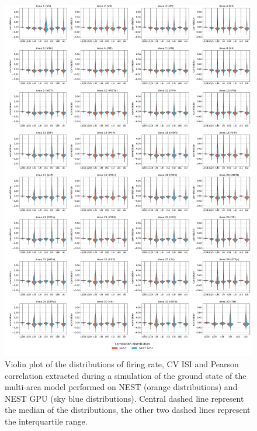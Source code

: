 \documentclass[a4paper, 12pt, twoside, openright]{book}
\begin{document}
\begin{figure}[H]
    \centering
    \includegraphics[width=\columnwidth]{figures/dist_violinplot_vert_gs_correlation.pdf}
    \caption{Violin plot of the distributions of firing rate, CV ISI and Pearson correlation extracted during a simulation of the ground state of the multi-area model performed on NEST (orange distributions) and NEST GPU (sky blue distributions). Central dashed line represent the median of the distributions, the other two dashed lines represent the interquartile range.}
    \label{fig:mam_gs_dist}
\end{figure}
\end{document}
